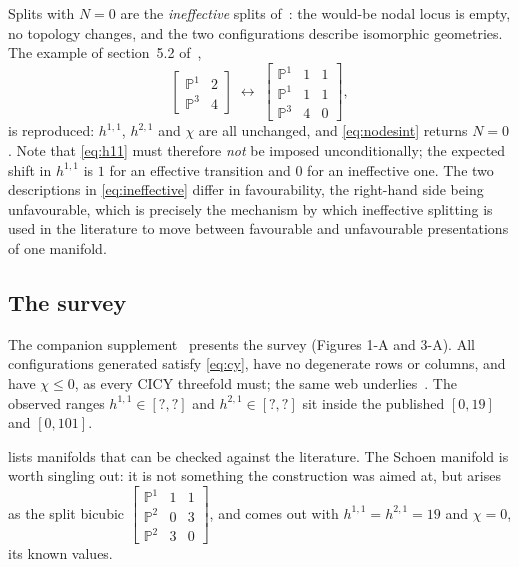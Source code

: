 \documentclass[11pt,a4paper]{article}
\newcommand{\FactHminOne}{?}\newcommand{\FactHmaxOne}{?}
\newcommand{\FactHminTwo}{?}\newcommand{\FactHmaxTwo}{?}
\newcommand{\PP}{\mathbb{P}}
\theoremstyle{definition}
\begin{document}
Splits with $N=0$ are the \emph{ineffective} splits of~\cite{Candelas1988}:
the would-be nodal locus is empty, no topology changes, and the two
configurations describe isomorphic geometries. The example of section~5.2
of~\cite{Anderson2025},
%
\begin{equation}
\begin{bmatrix}\PP^1 & 2\\ \PP^3 & 4\end{bmatrix}
\;\longleftrightarrow\;
\begin{bmatrix}\PP^1 & 1 & 1\\ \PP^1 & 1 & 1\\ \PP^3 & 4 & 0\end{bmatrix},
\label{eq:ineffective}
\end{equation}
%
is reproduced: $h^{1,1}$, $h^{2,1}$ and $\chi$ are all unchanged, and
\cref{eq:nodesint} returns $N=0$. Note that \cref{eq:h11} must therefore
\emph{not} be imposed unconditionally; the expected shift in $h^{1,1}$ is $1$
for an effective transition and $0$ for an ineffective one. The two
descriptions in \cref{eq:ineffective} differ in favourability, the right-hand
side being unfavourable, which is precisely the mechanism by which
ineffective splitting is used in the literature to move between favourable
and unfavourable presentations of one manifold.

\subsection{The survey}



The companion supplement~\cite{SuppFigures} presents the survey (Figures 1-A and 3-A).
All configurations generated satisfy \cref{eq:cy}, have no degenerate rows or
columns, and have $\chi \le 0$, as every CICY threefold must; the same web
underlies~\cite{AndersonGaoGrayLee2017,AndersonFibrations2018}. The observed
ranges $h^{1,1}\in[\FactHminOne,\FactHmaxOne]$ and
$h^{2,1}\in[\FactHminTwo,\FactHmaxTwo]$ sit inside the published $[0,19]$ and
$[0,101]$.

 lists manifolds that can be checked against the
literature. The Schoen manifold is worth singling out: it is not something
the construction was aimed at, but arises as the split bicubic
$\left[\begin{smallmatrix}\PP^1 & 1 & 1\\ \PP^2 & 0 & 3\\
\PP^2 & 3 & 0\end{smallmatrix}\right]$, and comes out with
$h^{1,1}=h^{2,1}=19$ and $\chi=0$, its known values.
\end{document}
